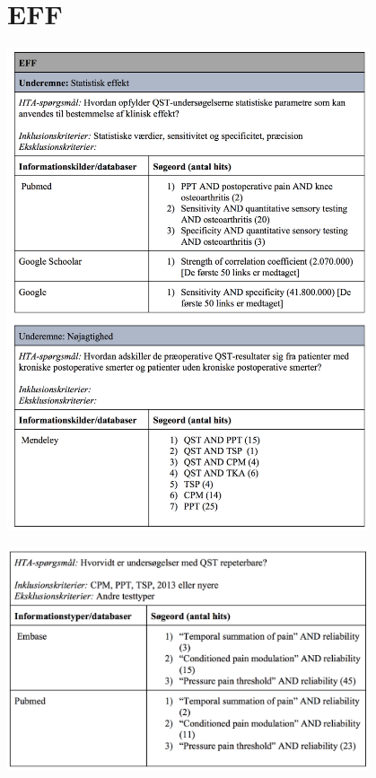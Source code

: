 \section{EFF}\label{EFF_sog}
\includegraphics[width=0.8\textwidth]{rapportAfsnit/qBilag/sogninger/EFF1}

\includegraphics[width=0.8\textwidth]{rapportAfsnit/qBilag/sogninger/EFF2}

